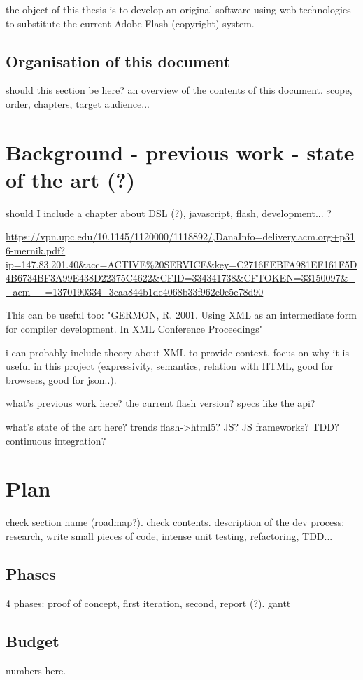 the object of this thesis is to develop an original software using web technologies to substitute the current Adobe Flash (copyright) system.

\section{Organisation of this document}
should this section be here? an overview of the contents of this document. scope, order, chapters, target audience...

\chapter{Background - previous work - state of the art (?)}
should I include a chapter about DSL (?), javascript, flash, development... ?

\url{https://vpn.upc.edu/10.1145/1120000/1118892/,DanaInfo=delivery.acm.org+p316-mernik.pdf?ip=147.83.201.40&acc=ACTIVE%20SERVICE&key=C2716FEBFA981EF161F5D4B6734BF3A99E438D22375C4622&CFID=334341738&CFTOKEN=33150097&__acm__=1370190334_3caa844b1de4068b33f962e0e5e78d90}

This can be useful too: "GERMON, R. 2001. Using XML as an intermediate form for compiler development. In XML Conference Proceedings"

i can probably include  theory about XML to provide context. focus on why it is useful in this project (expressivity, semantics, relation with HTML, good for browsers, good for json..).

what's previous work here? the current flash version? specs like the api?

what's state of the art here? trends flash->html5? JS? JS frameworks? TDD? continuous integration?

\chapter{Plan}
check section name (roadmap?). check contents.
description of the dev process: research, write small pieces of code, intense unit testing, refactoring, TDD...

\section{Phases}
4 phases: proof of concept, first iteration, second, report (?). gantt
\section{Budget}
numbers here.

